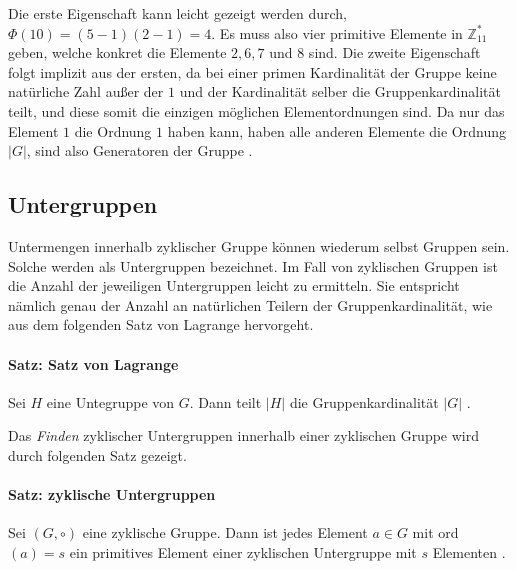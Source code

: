 Die erste Eigenschaft kann leicht gezeigt werden durch, $\Phi(10) = (5-1)(2-1) = 4$. Es muss also vier primitive Elemente in $\mathbb{Z}^*_{11}$ geben, welche konkret die Elemente $2,6,7$ und $8$ sind. Die zweite Eigenschaft folgt implizit aus der ersten, da bei einer primen Kardinalität der Gruppe keine natürliche Zahl außer der $1$ und der Kardinalität selber die Gruppenkardinalität teilt, und diese somit die einzigen möglichen Elementordnungen sind. Da nur das Element $1$ die Ordnung $1$ haben kann, haben alle anderen Elemente die Ordnung $|G|$, sind also Generatoren der Gruppe \cite[S. 244]{Paar.2016}.

\subsection{Untergruppen} \label{sec:untergruppen}
Untermengen innerhalb zyklischer Gruppe können wiederum selbst Gruppen sein. Solche werden als Untergruppen bezeichnet. Im Fall von zyklischen Gruppen ist die Anzahl der jeweiligen Untergruppen leicht zu ermitteln. Sie entspricht nämlich genau der Anzahl an natürlichen Teilern der Gruppenkardinalität, wie aus dem folgenden Satz von Lagrange hervorgeht.

\paragraph{Satz: Satz von Lagrange}
Sei $H$ eine Untegruppe von $G$. Dann teilt $|H|$ die Gruppenkardinalität $|G|$ \cite[S. 245]{Paar.2016}.

Das \textit{Finden} zyklischer Untergruppen innerhalb einer zyklischen Gruppe wird durch folgenden Satz gezeigt.

\paragraph{Satz: zyklische Untergruppen}
Sei $(G, \circ)$ eine zyklische Gruppe. Dann ist jedes Element $a \in G$ mit ord$(a) = s$ ein primitives Element einer zyklischen Untergruppe mit $s$ Elementen \cite[S. 244]{Paar.2016}.\\

